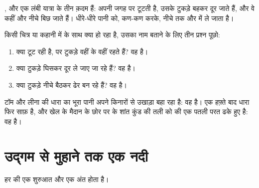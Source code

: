 ,  और  एक लंबी यात्रा के तीन क़दम हैं:  अपनी जगह पर
टूटती है, उसके टुकड़े बहकर दूर जाते हैं, और वे कहीं और नीचे बिछ जाते हैं।
धीरे-धीरे पानी  को, कण-कण करके, नीचे  तक और  में ले जाता
है।

\begin{method}\label{met:g5:water-shapes-the-land:naming}
किसी चित्र या कहानी में  के साथ क्या हो रहा है, उसका नाम बताने के लिए तीन
प्रश्न पूछो:
\begin{enumerate}
  \item क्या  टूट रही है, पर टुकड़े वहीं के वहीं रहते हैं?
        वह \emph{} है।
  \item क्या टुकड़े घिसकर दूर ले जाए जा रहे हैं? वह
        \emph{} है।
  \item क्या टुकड़े नीचे बैठकर ढेर बन रहे हैं? वह
        \emph{} है।
\end{enumerate}
\end{method}

\begin{example}[तूफ़ान के बाद की धारा]\label{ex:g5:water-shapes-the-land:stream}
टॉम और लीना की धारा का भूरा पानी अपने किनारों से उखाड़ा  बहा रहा है: वह
 है। एक हफ़्ते बाद धारा फिर साफ़ है, और खेल के मैदान के छोर पर के शांत
कुंड की तली को  की एक पतली परत ढके हुए है:
वह  है।
\end{example}

\section{उद्गम से मुहाने तक एक नदी}

हर  की एक शुरुआत और एक अंत होता है।

